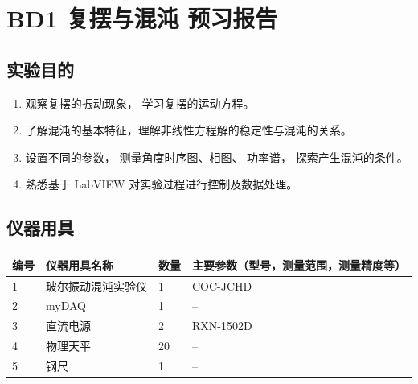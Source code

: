 
\setcounter{section}{0}
\section{BD1 复摆与混沌 \quad 预习报告}

\subsection{实验目的}
\begin{enumerate}
	\item 观察复摆的振动现象， 学习复摆的运动方程。
	
	\item 了解混沌的基本特征，理解非线性方程解的稳定性与混沌的关系。
	
	\item 设置不同的参数， 测量角度时序图、相图、 功率谱， 探索产生混沌的条件。
	
	\item 熟悉基于 LabVIEW 对实验过程进行控制及数据处理。
\end{enumerate}

\subsection{仪器用具}
\begin{table}[htbp]
	\centering
	\renewcommand\arraystretch{1.6}
	\begin{tabular}{p{}|p{}|p{}|p{}}
		\hline
		编号& 仪器用具名称 & 数量 &  主要参数（型号，测量范围，测量精度等） \\
		\hline
		1& 玻尔振动混沌实验仪 & 1 & COC-JCHD \\
		
		2& myDAQ & 1 & -- \\
		
		3& 直流电源 & 2 & RXN-1502D \\
		
		4& 物理天平 & 20 & -- \\
		
		5& 钢尺 & 1 & -- \\
		\hline
	\end{tabular}
\end{table}

